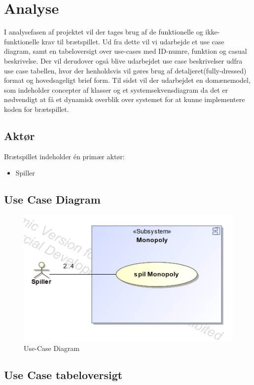 \documentclass[../main.tex]{subfiles}
\begin{document}
\section{Analyse}

\begin{flushleft} 
I analysefasen af projektet vil der tages  brug af de  funktionelle og ikke-funktionelle krav til brætspillet. Ud fra dette vil vi udarbejde et use case diagram, samt en tabeloversigt over use-cases med ID-numre, funktion og casual beskrivelse. 
Der vil derudover også blive udarbejdet use case beskrivelser udfra use case tabellen, hvor der henholdsvis vil gøres brug af detaljeret(fully-dressed) format og hovedsageligt brief form.
 Til sidst vil der udarbejdet en domænemodel, som indeholder concepter af klasser og et systemsekvensdiagram da det er nødvendigt at få et dynamisk overblik over systemet for at kunne implementere koden for brætspillet.
\end{flushleft}


\subsection{Aktør}
Brætspillet indeholder én primær aktør:
\begin{itemize}
  \item  Spiller
\end{itemize}


\subsection{Use Case Diagram}
\begin{figure}[H]
    \centering
    \includegraphics[width=0.6\linewidth]{figures/use-case_Diagram.png}
    \caption{Use-Case Diagram}
    \label{fig:UCDia}
\end{figure}

\newpage 

\subsection{Use Case tabeloversigt}
\end{document}
